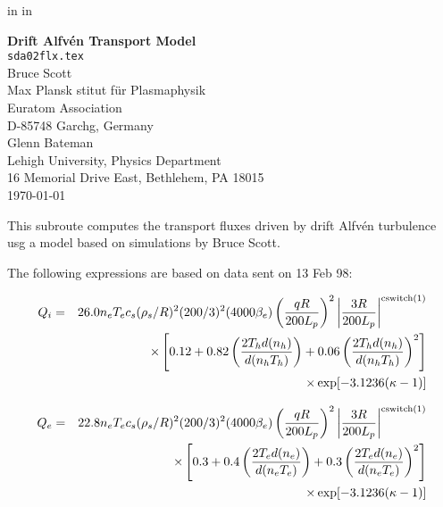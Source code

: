 
\headheight 0pt \headsep 0pt          
\topmargin 0pt   in
\oddsidemargin 0pt  in

\newcommand{\Partial}[2]{\frac{\partial #1}{\partial #2}}
\newcommand{\jacobian}{{\cal J}}



\begin{center} 
\large {\bf Drift Alfv\'{e}n Transport Model} \\
\normalsize  {\tt sda02flx.tex} \\
\vspace{1pc}
Bruce Scott \\
Max Plansk stitut f\"{u}r Plasmaphysik \\
Euratom Association \\
D-85748 Garchg, Germany \\
\vspace{1pc}
Glenn Bateman \\
Lehigh University, Physics Department \\
16 Memorial Drive East, Bethlehem, PA 18015 \\
\vspace{1pc}
\today
\end{center}

This subroute computes the transport fluxes driven by
drift Alfv\'{e}n turbulence usg a model based on
simulations by Bruce Scott.

The following expressions are based on data sent on 13 Feb 98:

\begin{eqnarray*}
Q_i
 & = & 26.0 n_e T_e c_s ( \rho_s / R )^2 ( 200 / 3 )^2
      ( 4000 \beta_e ) \left( \frac{ q R }{ 200 L_{p} } \right)^2
      \left| \frac{ 3 R }{ 200 L_p } \right|^{\rm cswitch(1)}  \\
 & & \times \left[ 0.12
 + 0.82 \left( \frac{ 2 T_h d ( n_h ) }{ d ( n_h T_h ) } \right)
 + 0.06 \left( \frac{ 2 T_h d ( n_h ) }{ d ( n_h T_h ) } \right)^2
      \right] \\
 & & \times \exp [ -3.1236 ( \kappa - 1 ) ]
\end{eqnarray*}

\begin{eqnarray*}
Q_e
 & = & 22.8 n_e T_e c_s ( \rho_s / R )^2 ( 200 / 3 )^2
      ( 4000 \beta_e ) \left( \frac{ q R }{ 200 L_{p} } \right)^2
      \left| \frac{ 3 R }{ 200 L_p } \right|^{\rm cswitch(1)}  \\
 & &  \times \left[ 0.3
 + 0.4 \left( \frac{ 2 T_e d ( n_e ) }{ d ( n_e T_e ) } \right)
 + 0.3 \left( \frac{ 2 T_e d ( n_e ) }{ d ( n_e T_e ) } \right)^2
      \right] \\
 & & \times \exp [ -3.1236 ( \kappa - 1 ) ]
\end{eqnarray*}

